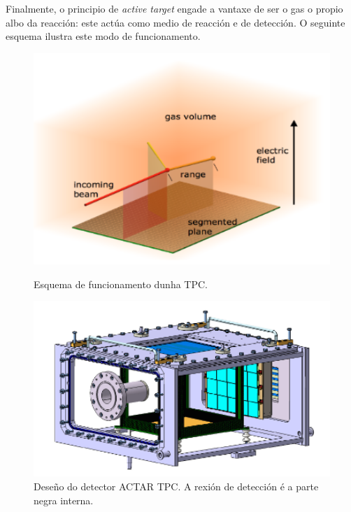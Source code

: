 \documentclass[11pt, a4paper]{article}
\begin{document}
Finalmente, o principio de \textit{active target} engade a vantaxe de ser o gas o propio albo da reacción: este actúa como medio de reacción e de detección. O seguinte esquema ilustra este modo de funcionamento.
\begin{figure}[!ht]
    \begin{minipage}[b]{.45\textwidth}
        \centering
        \includegraphics[width=1\textwidth]{figures/tpc.png}
        \caption{Esquema de funcionamento dunha TPC.}
        \label{fig:tpc}
    \end{minipage}
    \hfill
    \begin{minipage}[b]{.45\textwidth}
        \centering
        \includegraphics[width=1\textwidth]{figures/actar.png}
        \caption{Deseño do detector ACTAR TPC. A rexión de detección é a parte negra interna.}
        \label{fig:actar}
    \end{minipage}
\end{figure}
\end{document}
